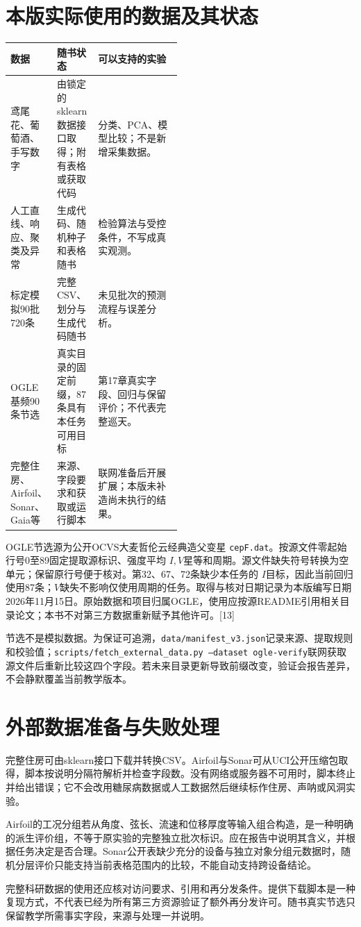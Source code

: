 
\section{本版实际使用的数据及其状态}
\begin{center}\small
\begin{tabularx}{\linewidth}{p{0.25\linewidth}p{0.24\linewidth}X}\toprule
数据&随书状态&可以支持的实验\\\midrule
鸢尾花、葡萄酒、手写数字&由锁定的sklearn数据接口取得；附有表格或获取代码&分类、PCA、模型比较；不是新增采集数据。\\
人工直线、响应、聚类及异常&生成代码、随机种子和表格随书&检验算法与受控条件，不写成真实观测。\\
标定模拟90批720条&完整CSV、划分与生成代码随书&未见批次的预测流程与误差分析。\\
OGLE基频90条节选&真实目录的固定前缀，87条具有本任务可用目标&第17章真实字段、回归与保留评价；不代表完整巡天。\\
完整住房、Airfoil、Sonar、Gaia等&来源、字段要求和获取或运行脚本&联网准备后开展扩展；本版未补造尚未执行的结果。\\\bottomrule
\end{tabularx}\end{center}

OGLE节选源为公开OCVS大麦哲伦云经典造父变星 \texttt{cepF.dat}。按源文件零起始行号0至89固定提取源标识、强度平均 $I,V$星等和周期。源文件缺失符号转换为空单元；保留原行号便于核对。第32、67、72条缺少本任务的 $I$目标，因此当前回归使用87条；$V$缺失不影响仅使用周期的任务。取得与核对日期记录为本版编写日期2026年11月15日。原始数据和项目归属OGLE，使用应按源README引用相关目录论文；本书不对第三方数据重新赋予其他许可。[13]

节选不是模拟数据。为保证可追溯，\texttt{data/manifest\_v3.json}记录来源、提取规则和校验值；\texttt{scripts/fetch\_external\_data.py --dataset ogle-verify}联网获取源文件后重新比较这四个字段。若未来目录更新导致前缀改变，验证会报告差异，不会静默覆盖当前教学版本。

\section{外部数据准备与失败处理}
完整住房可由sklearn接口下载并转换CSV。Airfoil与Sonar可从UCI公开压缩包取得，脚本按说明分隔符解析并检查字段数。没有网络或服务器不可用时，脚本终止并给出错误；它不会改用糖尿病数据或人工数据然后继续标作住房、声呐或风洞实验。

Airfoil的工况分组若从角度、弦长、流速和位移厚度等输入组合构造，是一种明确的派生评价组，不等于原实验的完整独立批次标识。应在报告中说明其含义，并根据任务决定是否合理。Sonar公开表缺少充分的设备与独立对象分组元数据时，随机分层评价只能支持当前表格范围内的比较，不能自动支持跨设备结论。

完整科研数据的使用还应核对访问要求、引用和再分发条件。提供下载脚本是一种复现方式，不代表已经为所有第三方资源验证了额外再分发许可。随书真实节选只保留教学所需事实字段，来源与处理一并说明。
